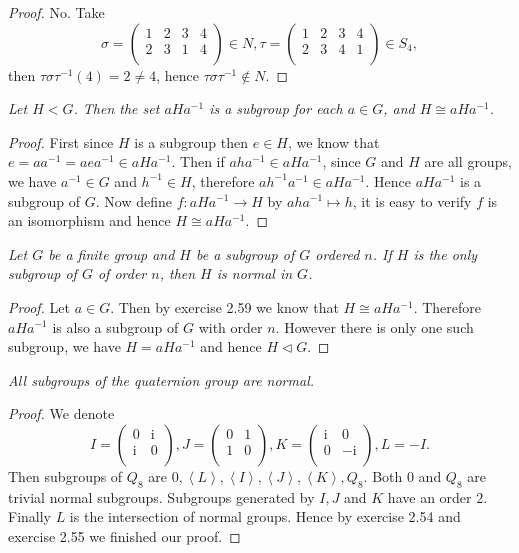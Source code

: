 \begin{proof}
No. Take 
$$
\sigma =\left( \begin{matrix}
	1&		2&		3&		4\\
	2&		3&		1&		4\\
\end{matrix} \right) \in N,\tau =\left( \begin{matrix}
	1&		2&		3&		4\\
	2&		3&		4&		1\\
\end{matrix} \right) \in S_4,
$$
then $\tau \sigma \tau ^{-1}\left( 4 \right) =2\ne 4$, hence $\tau\sigma\tau^{-1}\notin N$.
\end{proof}
\begin{problem}\em
Let $H<G$. Then the set $aHa^{-1}$ is a subgroup for each $a\in G$, and $H\cong aHa^{-1}$.
\end{problem}
\begin{proof}
First since $H$ is a subgroup then $e\in H$, we know that $e=aa^{-1}=aea^{-1}\in aHa^{-1}$. Then if $aha^{-1}\in aHa^{-1}$, since $G$ and $H$ are all groups, we have $a^{-1}\in G$ and $h^{-1}\in H$, therefore $ah^{-1}a^{-1}\in aHa^{-1}$. Hence $aHa^{-1}$ is a subgroup of $G$. Now define $f:aHa^{-1}\to H$ by $aha^{-1}\mapsto h$, it is easy to verify $f$ is an isomorphism and hence $H\cong aHa^{-1}$.
\end{proof}
\begin{problem}\em
Let $G$ be a finite group and $H$ be a subgroup of $G$ ordered $n$. If $H$ is the only subgroup of $G$ of order $n$, then $H$ is normal in $G$.
\end{problem}
\begin{proof}
Let $a\in G$. Then by exercise 2.59 we know that $H\cong aHa^{-1}$. Therefore $aHa^{-1}$ is also a subgroup of $G$ with order $n$. However there is only one such subgroup, we have $H=aHa^{-1}$ and hence $H\lhd G$.
\end{proof}
\begin{problem}\em
All subgroups of the quaternion group are normal.
\end{problem}
\begin{proof}
We denote 
$$
I=\left( \begin{matrix}
	0&		\mathrm{i}\\
	\mathrm{i}&		0\\
\end{matrix} \right) ,J=\left( \begin{matrix}
	0&		1\\
	1&		0\\
\end{matrix} \right) ,K=\left( \begin{matrix}
	\mathrm{i}&		0\\
	0&		-\mathrm{i}\\
\end{matrix} \right) ,L=-I.
$$
Then subgroups of $Q_8$ are $0,\left< L \right> ,\left< I \right> ,\left< J \right> ,\left< K \right> ,Q_8$. Both $0$ and $Q_8$ are trivial normal subgroups. Subgroups generated by $I,J$ and $K$ have an order $2$. Finally $L$ is the intersection of normal groups. Hence by exercise 2.54 and exercise 2.55 we finished our proof.
\end{proof}
